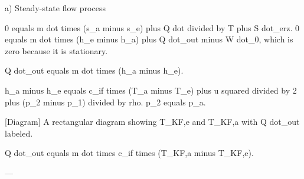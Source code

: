 a) Steady-state flow process  

0 equals m dot times (s_a minus s_e) plus Q dot divided by T plus S dot_erz.  
0 equals m dot times (h_e minus h_a) plus Q dot_out minus W dot_0, which is zero because it is stationary.  

Q dot_out equals m dot times (h_a minus h_e).  

h_a minus h_e equals c_if times (T_a minus T_e) plus u squared divided by 2 plus (p_2 minus p_1) divided by rho.  
p_2 equals p_a.  

[Diagram]  
A rectangular diagram showing T_KF,e and T_KF,a with Q dot_out labeled.  

Q dot_out equals m dot times c_if times (T_KF,a minus T_KF,e).  

---
